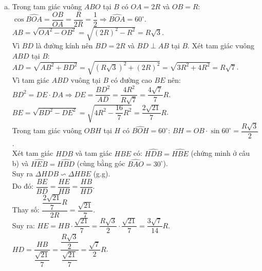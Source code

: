 \begin{bt}
{\begin{enumerate}[a)]
	Xét tam giác $ODH$ và tam giác $OAD$, ta có:
	$\dfrac{OD}{OH} = \dfrac{OA}{OD}$ và góc $\widehat{AOD}$ chung.\\
	Suy ra $\Delta ODH \backsim \Delta OAD$ (c.g.c), do đó $\widehat{ODH} = \widehat{OAD}$, hay $\widehat{HDO} = \widehat{EAB}$.\\
	Mặt khác, trong tứ giác nội tiếp $ABHE$, ta có $\widehat{HBE} = \widehat{EAH}$ (hai góc nội tiếp cùng chắn cung $EH$).\\
	Mà $E, A, D$ thẳng hàng nên $\widehat{EAH} = \widehat{EAB}$.\\
	Từ đó suy ra $\widehat{HDO} = \widehat{HBE}$.
	\item Trong tam giác vuông $ABO$ tại $B$ có $OA = 2R$ và $OB = R$:\\
	$\cos\widehat{BOA} = \dfrac{OB}{OA} = \dfrac{R}{2R} = \dfrac{1}{2} \Rightarrow \widehat{BOA} = 60^\circ$.\\
	$AB = \sqrt{OA^2 - OB^2} = \sqrt{(2R)^2 - R^2} = R\sqrt{3}$.\\
	Vì $BD$ là đường kính nên $BD = 2R$ và $BD \perp AB$ tại $B$. Xét tam giác vuông $ABD$ tại $B$:
	$AD = \sqrt{AB^2 + BD^2} = \sqrt{(R\sqrt{3})^2 + (2R)^2} = \sqrt{3R^2 + 4R^2} = R\sqrt{7}$.\\
	Vì tam giác $ABD$ vuông tại $B$ có đường cao $BE$ nên:
	$BD^2 = DE \cdot DA \Rightarrow DE = \dfrac{BD^2}{AD} = \dfrac{4R^2}{R\sqrt{7}} = \dfrac{4\sqrt{7}}{7}R$.\\
	$BE = \sqrt{BD^2 - DE^2} = \sqrt{4R^2 - \dfrac{16}{7}R^2} = \dfrac{2\sqrt{21}}{7}R$.\\
	Trong tam giác vuông $OBH$ tại $H$ có $\widehat{BOH} = 60^\circ$:
	$BH = OB \cdot \sin 60^\circ = \dfrac{R\sqrt{3}}{2}$.\\
	Xét tam giác $HDB$ và tam giác $HBE$ có:
	$\widehat{HDB} = \widehat{HBE}$ (chứng minh ở câu b) và $\widehat{HEB} = \widehat{HBD}$ (cùng bằng góc $\widehat{BAO} = 30^\circ$).\\
	Suy ra $\Delta HDB \backsim \Delta HBE$ (g.g).\\
	Do đó: $\dfrac{BE}{BD} = \dfrac{HE}{HB} = \dfrac{HB}{HD}$.\\
	Thay số: $\dfrac{\dfrac{2\sqrt{21}}{7}R}{2R} = \dfrac{\sqrt{21}}{7}$.\\
	Suy ra:
	$HE = HB \cdot \dfrac{\sqrt{21}}{7} = \dfrac{R\sqrt{3}}{2} \cdot \dfrac{\sqrt{21}}{7} = \dfrac{3\sqrt{7}}{14}R$.\\
	$HD = \dfrac{HB}{\dfrac{\sqrt{21}}{7}} = \dfrac{\dfrac{R\sqrt{3}}{2}}{\dfrac{\sqrt{21}}{7}} = \dfrac{\sqrt{7}}{2}R$.\\

\end{enumerate}}
\end{bt}
